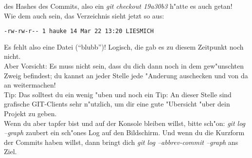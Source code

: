 \documentclass[german,a4paper]{report}
\begin{document}
des Hashes des Commits, also ein \textit{git checkout 19a30b3}
h"atte es auch getan!\\
Wie dem auch sein, das Verzeichnis sieht jetzt so aus:
\begin{verbatim}
-rw-rw-r-- 1 hauke 14 Mar 22 13:20 LIESMICH
\end{verbatim}
Es fehlt also eine Datei (``blubb'')! Logisch, die gab es zu diesem
Zeitpunkt noch nicht.\\
Aber Vorsicht: Es muss nicht sein, dass du dich dann noch in dem
gew"unschten Zweig befindest; du kannst an jeder Stelle jede
"Anderung auschecken und von da an weitermachen!\\
Tip: Das solltest du ein wenig "uben und noch ein Tip: An
dieser Stelle sind grafische GIT-Clients sehr n"utzlich, um
dir eine gute "Ubersicht "uber dein Projekt zu geben.\\
Wenn du aber tapfer bist und auf der Konsole bleiben willst,
bitte sch"on: \textit{git log --graph} zaubert
ein sch"ones Log auf den Bildschirm. Und wenn du die Kurzform
der Commits haben willst, dann bringt dich
\textit{git log --abbrev-commit --graph} ans Ziel.
\end{document}

